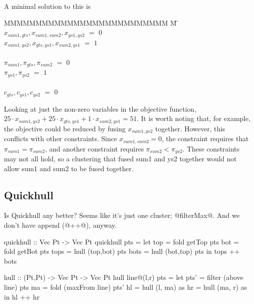 A minimal solution to this is
\begin{tabbing}
MMMMMMMMMMMMMMMMMMMMMMMMMM \= M \= \kill
$x_{sum1, gts}, x_{sum1, sum2}, x_{ys1,  ys2}$
    \> $=$ \> $0$ \\
$x_{sum1, ys2}, x_{gts, ys1 }, x_{sum2, ys1}$
    \> $=$ \> $1$ \\
\\
$\pi_{sum1}, \pi_{gts }, \pi_{sum2}$
    \> $=$ \> $0$ \\
$\pi_{ys1 }, \pi_{ys2 }$
    \> $=$ \> $1$ \\
\\
$c_{gts}, c_{ys1}, c_{ys2}$           
    \> $=$ \> $0$ \\
\end{tabbing}
Looking at just the non-zero variables in the objective function,
$25 \cdot x_{sum1,ys2} + 25 \cdot x_{gts,ys1} + 1 \cdot x_{sum2, ys1} = 51$.
It is worth noting that, for example, the objective could be reduced by fusing $x_{sum1,ys2}$ together.
However, this conflicts with other constraints. Since $x_{sum1, sum2} = 0$, the constraint requires that $\pi_{sum1} = \pi_{sum2}$, and another constraint requires $\pi_{sum2} < \pi_{ys2}$.
These constraints may not all hold, so a clustering that fused sum1 and ys2 together would not allow sum1 and sum2 to be fused together.





\subsection{Quickhull}
Is Quickhull any better? Seems like it's just one cluster; @filterMax@. And we don't have append (@++@), anyway.
\begin{code}
quickhull :: Vec Pt -> Vec Pt
quickhull pts
 = let top  = fold getTop pts
       bot  = fold getBot pts
       tops = hull (top,bot) pts
       bots = hull (bot,top) pts
   in  tops ++ bots

hull :: (Pt,Pt) -> Vec Pt -> Vec Pt
hull line@(l,r) pts
 = let pts' = filter (above   line) pts
       ma   = fold   (maxFrom line) pts'
       hl   = hull   (l, ma)        as
       hr   = hull   (ma, r)        as
   in  hl  ++ hr
\end{code}
